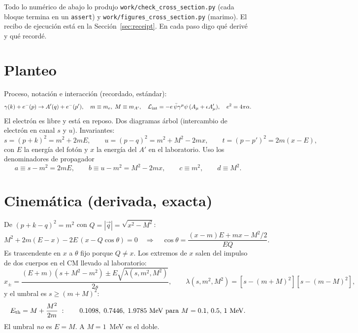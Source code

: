 \documentclass[11pt,a4paper]{article}
\newcommand{\Ap}{A'}
\newcommand{\eps}{\epsilon}
\begin{document}
Todo lo numérico de abajo lo produjo \texttt{work/check\_cross\_section.py} (cada bloque termina en un \texttt{assert}) y
\texttt{work/figures\_cross\_section.py} (marimo). El recibo de ejecución está en la Sección~\ref{sec:receipt}. En cada
paso digo qué derivé y qué recordé.

\section{Planteo}
Proceso, notación e interacción (recordado, estándar):
\begin{equation}
\gamma(k)+e^-(p)\to \Ap(q)+e^-(p'),\quad m\equiv m_e,\; M\equiv m_{\Ap},\quad
\mathcal L_{\rm int}=-e\,\bar\psi\gamma^\mu\psi\,(A_\mu+\eps A'_\mu),\quad e^2=4\pi\alpha .
\end{equation}
El electrón es libre y está en reposo. Dos diagramas árbol (intercambio de electrón en canal $s$ y $u$). Invariantes:
\begin{equation}
s=(p+k)^2=m^2+2mE,\qquad u=(p-q)^2=m^2+M^2-2mx,\qquad t=(p-p')^2=2m(x-E),
\end{equation}
con $E$ la energía del fotón y $x$ la energía del $\Ap$ en el laboratorio. Uso los denominadores de propagador
\begin{equation}
a\equiv s-m^2=2mE,\qquad b\equiv u-m^2=M^2-2mx,\qquad c\equiv m^2,\qquad d\equiv M^2 .
\label{eq:abcd}
\end{equation}

\section{Cinemática (derivada, exacta)}
De $(p+k-q)^2=m^2$ con $Q=|\vec q|=\sqrt{x^2-M^2}$:
\begin{equation}
M^2+2m(E-x)-2E\,(x-Q\cos\theta)=0
\quad\Longrightarrow\quad
\cos\theta=\frac{(x-m)E+mx-M^2/2}{EQ}.
\label{eq:costheta}
\end{equation}
Es trascendente en $x$ a $\theta$ fijo porque $Q\neq x$. Los extremos de $x$ salen del impulso de dos cuerpos en el CM
llevado al laboratorio:
\begin{equation}
x_\pm=\frac{(E+m)(s+M^2-m^2)\pm E\sqrt{\lambda(s,m^2,M^2)}}{2s},\qquad
\lambda(s,m^2,M^2)=[s-(m+M)^2][s-(m-M)^2],
\label{eq:xpm}
\end{equation}
y el umbral es $s\ge (m+M)^2$:
\begin{equation}
E_{\rm th}=M+\frac{M^2}{2m}\;:\qquad 0.1098,\;0.7446,\;1.9785~\text{MeV para }M=0.1,\,0.5,\,1~\text{MeV}.
\label{eq:thr}
\end{equation}
El umbral \emph{no} es $E=M$. A $M=1$~MeV es el doble.
\end{document}
